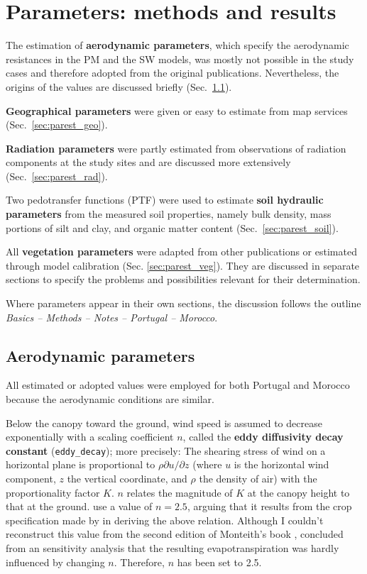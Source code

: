 \documentclass{scrreprt}
\begin{document}

\chapter{Parameters: methods and results} \label{ch:parest}

The estimation of \textbf{aerodynamic parameters}, which specify the aerodynamic resistances in the PM and the SW models, was mostly not possible in the study cases and therefore adopted from the original publications.
Nevertheless, the origins of the values are discussed briefly (Sec.~\ref{sec:parest_aero}).

\textbf{Geographical parameters} were given or easy to estimate from map services (Sec.~\ref{sec:parest_geo}).

\textbf{Radiation parameters} were partly estimated from observations of radiation components at the study sites and are discussed more extensively (Sec.~\ref{sec:parest_rad}).

Two pedotransfer functions (PTF) were used to estimate \textbf{soil hydraulic parameters} from the measured soil properties, namely bulk density, mass portions of silt and clay, and organic matter content (Sec.~\ref{sec:parest_soil}).

All \textbf{vegetation parameters} were adapted from other publications or estimated through model calibration (Sec. \ref{sec:parest_veg}).
They are discussed in separate sections to specify the problems and possibilities relevant for their determination.

Where parameters appear in their own sections, the discussion follows the outline \emph{Basics -- Methods -- Notes -- Portugal -- Morocco}.

\newpage
\section{Aerodynamic parameters} \label{sec:parest_aero}

All estimated or adopted values were employed for both Portugal and Morocco because the aerodynamic conditions are similar.

Below the canopy toward the ground, wind speed is assumed to decrease exponentially with a scaling coefficient $n$, called the \textbf{eddy diffusivity decay constant} (\verb!eddy_decay!); more precisely:
The shearing stress of wind on a horizontal plane is proportional to $\rho \partial u / \partial z$ (where $u$ is the horizontal wind component, $z$ the vertical coordinate, and $\rho$ the density of air) with the proportionality factor $K$.
$n$ relates the magnitude of $K$ at the canopy height to that at the ground.
\citet{shuttleworth85} use a value of $n = 2.5$, arguing that it results from the crop specification made by \citet{monteith73} in deriving the above relation.
Although I couldn't reconstruct this value from the second edition of Monteith's book \citep{monteith90}, \citet{shuttleworth85} concluded from an sensitivity analysis that the resulting evapotranspiration was hardly influenced by changing $n$.
Therefore, $n$ has been set to 2.5.
\end{document}
